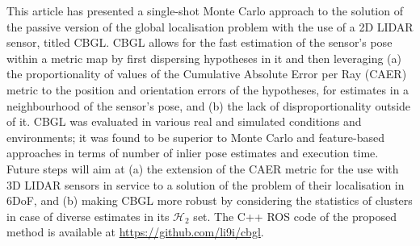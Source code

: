 This article has presented a single-shot Monte Carlo approach to the solution
of the passive version of the global localisation problem with the use of a 2D
LIDAR sensor, titled CBGL. CBGL allows for the fast estimation of the sensor's
pose within a metric map by first dispersing hypotheses in it and then
leveraging (a) the proportionality of values of the Cumulative Absolute Error
per Ray (CAER) metric to the position and orientation errors of the hypotheses,
for estimates in a neighbourhood of the sensor's pose, and (b) the lack of
disproportionality outside of it. CBGL was evaluated in various real and
simulated conditions and environments; it was found to be superior to Monte
Carlo and feature-based approaches in terms of number of inlier pose estimates
and execution time. Future steps will aim at (a) the extension of the CAER
metric for the use with 3D LIDAR sensors in service to a solution of the
problem of their localisation in 6DoF, and (b) making CBGL more robust by
considering the statistics of clusters in case of diverse estimates in its
$\mathcal{H}_2$ set. The C++ ROS code of the proposed method is available at
\url{https://github.com/li9i/cbgl}.

